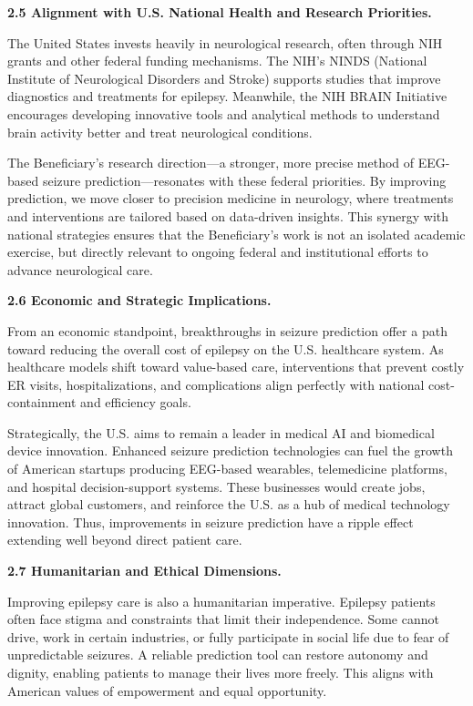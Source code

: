 \documentclass{article}
\begin{document}
{\bf 2.5 Alignment with U.S. National Health and Research Priorities. }

The United States invests heavily in neurological research, often through NIH grants and other federal funding mechanisms. The NIH’s NINDS (National Institute of Neurological Disorders and Stroke) supports studies that improve diagnostics and treatments for epilepsy. Meanwhile, the NIH BRAIN Initiative encourages developing innovative tools and analytical methods to understand brain activity better and treat neurological conditions.

The Beneficiary’s research direction—a stronger, more precise method of EEG-based seizure prediction—resonates with these federal priorities. By improving prediction, we move closer to precision medicine in neurology, where treatments and interventions are tailored based on data-driven insights. This synergy with national strategies ensures that the Beneficiary’s work is not an isolated academic exercise, but directly relevant to ongoing federal and institutional efforts to advance neurological care.


{\bf 2.6 Economic and Strategic Implications. }

From an economic standpoint, breakthroughs in seizure prediction offer a path toward reducing the overall cost of epilepsy on the U.S. healthcare system. As healthcare models shift toward value-based care, interventions that prevent costly ER visits, hospitalizations, and complications align perfectly with national cost-containment and efficiency goals.

Strategically, the U.S. aims to remain a leader in medical AI and biomedical device innovation. Enhanced seizure prediction technologies can fuel the growth of American startups producing EEG-based wearables, telemedicine platforms, and hospital decision-support systems. These businesses would create jobs, attract global customers, and reinforce the U.S. as a hub of medical technology innovation. Thus, improvements in seizure prediction have a ripple effect extending well beyond direct patient care.

{\bf 2.7 Humanitarian and Ethical Dimensions. }

Improving epilepsy care is also a humanitarian imperative. Epilepsy patients often face stigma and constraints that limit their independence. Some cannot drive, work in certain industries, or fully participate in social life due to fear of unpredictable seizures. A reliable prediction tool can restore autonomy and dignity, enabling patients to manage their lives more freely. This aligns with American values of empowerment and equal opportunity.
\end{document}

